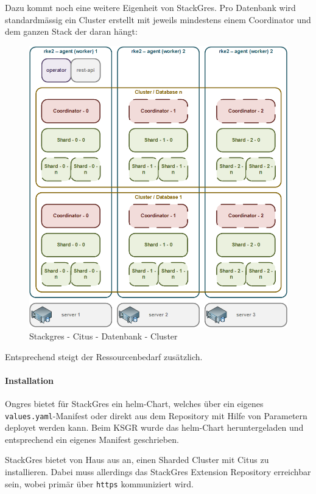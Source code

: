 \begin{flushleft}
    Dazu kommt noch eine weitere Eigenheit von StackGres.
    Pro Datenbank wird standardmässig ein Cluster erstellt mit jeweils mindestens einem Coordinator und dem ganzen Stack der daran hängt:
    \begin{figure}[H]
        \centering
        \includegraphics[width=0.8\linewidth]{source/implementation/evaluation/postgresql_ha_solutions/stackgres/stackgres_citus_architecture_clustering}
        \caption{Stackgres - Citus - Datenbank - Cluster}
        \label{fig:stackgres_citus_architecture_clustering}
    \end{figure}
    Entsprechend steigt der Ressourcenbedarf zusätzlich.
\end{flushleft}
\begin{flushleft}
    \paragraph{Installation}
    Ongres bietet für StackGres ein \gls{helm}-Chart, welches über ein eigenes \texttt{values.yaml}-Manifest oder direkt aus dem Repository mit Hilfe von Parametern deployet werden kann.
    Beim KSGR wurde das \gls{helm}-Chart heruntergeladen und entsprechend ein eigenes Manifest geschrieben.
\end{flushleft}
\begin{flushleft}
    StackGres bietet von Haus aus an, einen Sharded Cluster mit Citus zu installieren.
    Dabei muss allerdings das StackGres Extension Repository erreichbar sein, wobei primär über \texttt{https} kommuniziert wird.
\end{flushleft}
